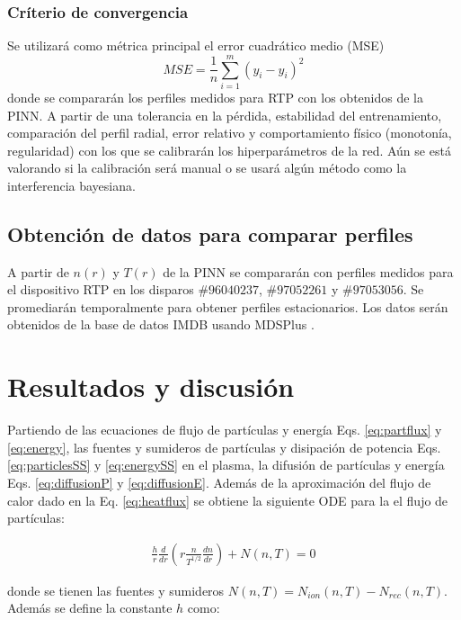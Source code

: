 \subsubsection{Críterio de convergencia}
\vspace{- 2 mm}
Se utilizará como métrica principal el error cuadrático medio (MSE)
\vspace{- 3 mm} 
\begin{equation}
MSE = \frac{1}{n}\sum\limits_{i = 1}^m(y_i - \hat{y}_i)^2
\end{equation}
donde se compararán los perfiles medidos para RTP con los obtenidos de la PINN. A partir de una tolerancia en la pérdida, estabilidad del entrenamiento, comparación del perfil radial, error relativo y comportamiento físico (monotonía, regularidad) con los que se calibrarán los hiperparámetros de la red. Aún se está valorando si la calibración será manual o se usará algún método como la interferencia bayesiana.
\vspace{- 5 mm}
\subsection{Obtención de datos para comparar perfiles}
A partir de $n(r)$ y $T(r)$ de la PINN se compararán con perfiles medidos para el dispositivo RTP en los disparos $\#96040237$, $\#97052261$ y $\#97053056$. Se promediarán temporalmente para obtener perfiles estacionarios. Los datos serán obtenidos de la base de datos IMDB \cite{roach2008} usando MDSPlus \cite{stillerman1997}.

\section{Resultados y discusión}

Partiendo de las ecuaciones de flujo de partículas y energía Eqs. \eqref{eq:partflux} y \eqref{eq:energy}, las fuentes y sumideros de partículas y disipación de potencia Eqs. \eqref{eq:particlesSS} y \eqref{eq:energySS} en el plasma, la difusión de partículas y energía Eqs. \eqref{eq:diffusionP} y \eqref{eq:diffusionE}. Además de la aproximación del flujo de calor dado en la Eq. \eqref{eq:heatflux} se obtiene la siguiente ODE para la el flujo de partículas:

\begin{eqnarray}\label{eq:partODE}
	\frac{h}{r}\frac{d}{dr}\left(r\frac{n}{T^{1/2}}\frac{dn}{dr}\right) + N(n, T) = 0
\end{eqnarray}

donde se tienen las fuentes y sumideros $N(n, T) = N_{ion}(n, T)  - N_{rec}(n, T)$. Además se define la constante $h$ como:

